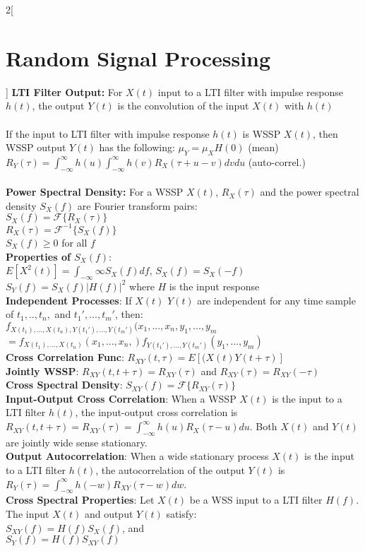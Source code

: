 \documentclass{article}
\begin{document}
	\begin{multicols}{2}[\section*{Random Signal Processing}]
	\textbf{LTI Filter Output:} For $X(t)$ input to a LTI filter with impulse response $h(t)$, the output $Y(t)$ is the convolution of the input $X(t)$ with $h(t)$\\
	\\
	If the input to LTI filter with impulse response $h(t)$ is WSSP $X(t)$, then WSSP output $Y(t)$ has the following: $\mu_Y = \mu_XH(0)$ (mean)\\ $R_Y(\tau) = \int_{-\infty}^{\infty}h(u)\int_{-\infty}^{\infty}h(v)R_X(\tau + u - v)dvdu$ (auto-correl.)\\ \\
	\textbf{Power Spectral Density:} For a WSSP $X(t)$, $R_X(\tau)$ and the power spectral density $S_X(f)$ are Fourier transform pairs:\\$S_X(f) = \mathcal{F}\{R_X(\tau)\}$\\$R_X(\tau) = \mathcal{F}^{-1}\{S_X(f)\}$\\ $S_X(f) \geq 0$ for all $f$\\

	\textbf{Properties of $S_X(f)$}:\\
    $E[X^2(t)] = \int_{-\infty}{\infty}S_X(f)df$, $S_X(f) = S_X(-f)$\\
    $S_Y(f) = S_X(f) \vert H(f) \vert^2$ where $H$ is the input response\\
	
    \textbf{Independent Processes}: If $X(t)$ $Y(t)$ are independent for any time sample of $t_1, .., t_n,$ and $t_1', ..., t_m'$, then:
	\\
	$f_{X(t_1), ..., X(t_n), Y(t_1'), ..., Y(t_m' )}(x_1, ..., x_n, y_1, ..., y_m$\\$ = f_{X(t_1), ...,X(t_n)}(x_1, ..., x_n,)f_{Y(t_1'), ...,Y(t_m' )}(y_1, ..., y_m)$
	\\
	\textbf{Cross Correlation Func}: $R_{XY}(t, \tau) = E[(X(t)Y(t + \tau)]$
	\\
	\textbf{Jointly WSSP}: $R_{XY}(t, t + \tau) = R_{XY}(\tau)$ and $R_{XY}(\tau) = R_{XY}(-\tau)$
	\\
	\textbf{Cross Spectral Density}: $S_{XY}(f) = \mathcal{F}\{R_{XY}(\tau)\}$
	\\
	\textbf{Input-Output Cross Correlation}: When a WSSP $X(t)$ is the input to a LTI filter $h(t)$, the input-output cross correlation is $R_{XY}(t, t + \tau) = R_{XY}(\tau) = \int_{-\infty}^{\infty}h(u)R_X(\tau - u)du$. Both $X(t)$ and $Y(t)$ are jointly wide sense stationary.
	\\
	\textbf{Output Autocorrelation}: When a wide stationary process $X(t)$ is the input to a LTI filter $h(t)$, the autocorrelation of the output $Y(t)$ is $R_Y(\tau) = \int_{-\infty}^{\infty}h(-w)R_{XY}(\tau - w)dw$.
	\\
	\textbf{Cross Spectral Properties}: Let $X(t)$ be a WSS input to a LTI filter $H(f)$. The input $X(t)$ and output $Y(t)$ satisfy:\\
    $S_{XY}(f) = H(f)S_X(f)$, and\\
    $S_Y(f) = H(f)S_{XY}(f)$
   	\end{multicols}
\end{document}
